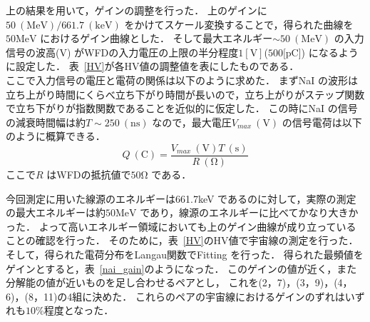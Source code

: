 上の結果を用いて，ゲインの調整を行った．
上のゲインに$50~(\mathrm{MeV})/661.7~(\mathrm{keV})$ をかけてスケール変換することで，得られた曲線を$50\mathrm{MeV}$ におけるゲイン曲線とした．
そして最大エネルギー$\sim 50~(\mathrm{MeV})$ の入力信号の波高($\mathrm{V}$) がWFDの入力電圧の上限の半分程度$1[\mathrm{V}]$($500[\mathrm{pC}$]) になるように設定した．
表~\ref{HV}が各HV値の調整値を表にしたものである．\\
ここで入力信号の電圧と電荷の関係は以下のように求めた．
まずNaI の波形は立ち上がり時間にくらべ立ち下がり時間が長いので，立ち上がりがステップ関数で立ち下がりが指数関数であることを近似的に仮定した．
この時にNaI の信号の減衰時間幅は約$T\sim 250~(\mathrm{ns})$ なので，最大電圧$V_{max}~(\mathrm{V})$ の信号電荷は以下のように概算できる．
\begin{equation}
Q~(\mathrm{C}) = \frac{V_{max}~(\mathrm{V})T~(\mathrm{s})}{R~(\mathrm{\Omega})}
\end{equation}
ここで$R$ はWFDの抵抗値で$50\mathrm{\Omega}$ である．

今回測定に用いた線源のエネルギーは661.7keV であるのに対して，実際の測定の最大エネルギーは約$50\mathrm{MeV}$ であり，線源のエネルギーに比べてかなり大きかった．
よって高いエネルギー領域においても上のゲイン曲線が成り立っていることの確認を行った．
そのために，表~\ref{HV}のHV値で宇宙線の測定を行った．
そして，得られた電荷分布をLangau関数でFitting を行った．
得られた最頻値をゲインとすると，表~\ref{nai_gain}のようになった．
このゲインの値が近く，また分解能の値が近いものを足し合わせるペアとし，
これを(2，7)，(3，9)，(4，6)，(8，11)の4組に決めた．
これらのペアの宇宙線におけるゲインのずれはいずれも$10\%$程度となった．

